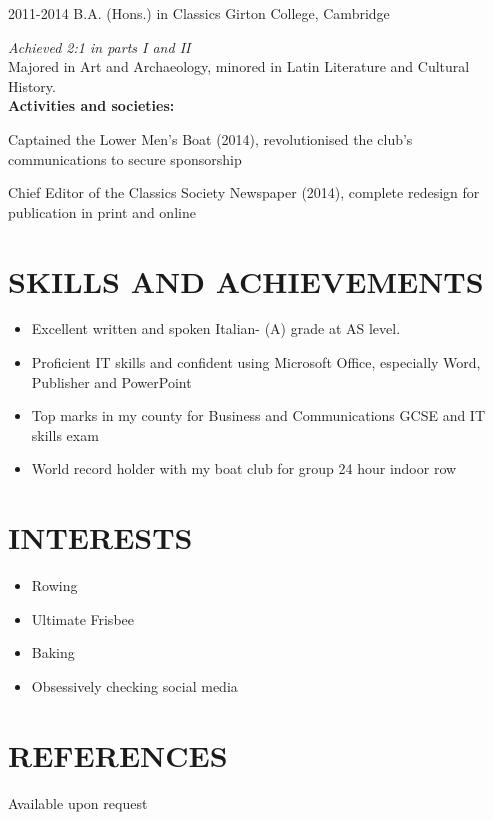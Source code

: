 \documentclass[]{friggeri-cv}
\begin{document}
\begin{entrylist}
	\entry
	{2011-2014}
	{B.A. (Hons.) in Classics}
	{Girton College, Cambridge}
	{\emph{Achieved 2:1 in parts I and II}
	\\
	
	Majored in Art and Archaeology, minored in Latin Literature and Cultural History.
	\\
	
	\textbf{Activities and societies:} 
	
	Captained the Lower Men's Boat (2014), revolutionised the club's communications to secure sponsorship
	
	Chief Editor of the Classics Society Newspaper (2014), complete redesign for publication in print and online
	}
\end{entrylist}

\section{SKILLS AND ACHIEVEMENTS}

\begin{itemize}
	\item Excellent written and spoken Italian- (A) grade at AS level. 
	\item Proficient IT skills and confident using Microsoft Office, especially Word, Publisher and PowerPoint
	\item Top marks in my county for Business and Communications GCSE and IT skills exam 
	\item World record holder with my boat club for group 24 hour indoor row
\end{itemize}

\section{INTERESTS}

\begin{itemize}
	\item Rowing
	\item Ultimate Frisbee
	\item Baking
	\item Obsessively checking social media
\end{itemize}

\section{REFERENCES}

Available upon request
\end{document}

